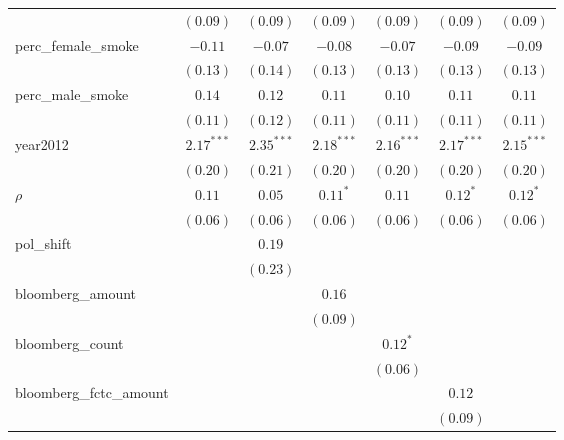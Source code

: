 \begin{table}[!h]
\begin{center}
\begin{tabular}{l c c c c c c }
                        & $(0.09)$     & $(0.09)$     & $(0.09)$     & $(0.09)$     & $(0.09)$     & $(0.09)$     \\
perc\_female\_smoke     & $-0.11$      & $-0.07$      & $-0.08$      & $-0.07$      & $-0.09$      & $-0.09$      \\
                        & $(0.13)$     & $(0.14)$     & $(0.13)$     & $(0.13)$     & $(0.13)$     & $(0.13)$     \\
perc\_male\_smoke       & $0.14$       & $0.12$       & $0.11$       & $0.10$       & $0.11$       & $0.11$       \\
                        & $(0.11)$     & $(0.12)$     & $(0.11)$     & $(0.11)$     & $(0.11)$     & $(0.11)$     \\
year2012                & $2.17^{***}$ & $2.35^{***}$ & $2.18^{***}$ & $2.16^{***}$ & $2.17^{***}$ & $2.15^{***}$ \\
                        & $(0.20)$     & $(0.21)$     & $(0.20)$     & $(0.20)$     & $(0.20)$     & $(0.20)$     \\
$\rho$                  & $0.11$       & $0.05$       & $0.11^{*}$   & $0.11$       & $0.12^{*}$   & $0.12^{*}$   \\
                        & $(0.06)$     & $(0.06)$     & $(0.06)$     & $(0.06)$     & $(0.06)$     & $(0.06)$     \\
pol\_shift              &              & $0.19$       &              &              &              &              \\
                        &              & $(0.23)$     &              &              &              &              \\
bloomberg\_amount       &              &              & $0.16$       &              &              &              \\
                        &              &              & $(0.09)$     &              &              &              \\
bloomberg\_count        &              &              &              & $0.12^{*}$   &              &              \\
                        &              &              &              & $(0.06)$     &              &              \\
bloomberg\_fctc\_amount &              &              &              &              & $0.12$       &              \\
                        &              &              &              &              & $(0.09)$     &              \\

\end{tabular}
\end{center}
\end{table}
